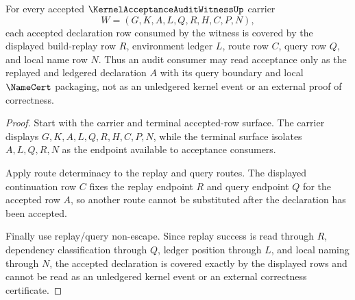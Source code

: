 \begin{theorem}
\label{thm:kernel-acceptance-audit-witness-build-replay-coverage}
For every accepted $\KernelAcceptanceAuditWitnessUp$ carrier
$$
W=(G,K,A,L,Q,R,H,C,P,N),
$$
each accepted declaration row consumed by the witness is covered by the displayed build-replay row $R$, environment ledger $L$, route row $C$, query row $Q$, and local name row $N$. Thus an audit consumer may read acceptance only as the replayed and ledgered declaration $A$ with its query boundary and local $\NameCert$ packaging, not as an unledgered kernel event or an external proof of correctness.
\end{theorem}
\begin{proof}
Start with the carrier and terminal accepted-row surface. The carrier displays $G,K,A,L,Q,R,H,C,P,N$, while the terminal surface isolates $A,L,Q,R,N$ as the endpoint available to acceptance consumers.

Apply route determinacy to the replay and query routes. The displayed continuation row $C$ fixes the replay endpoint $R$ and query endpoint $Q$ for the accepted row $A$, so another route cannot be substituted after the declaration has been accepted.

Finally use replay/query non-escape. Since replay success is read through $R$, dependency classification through $Q$, ledger position through $L$, and local naming through $N$, the accepted declaration is covered exactly by the displayed rows and cannot be read as an unledgered kernel event or an external correctness certificate.
\end{proof}

